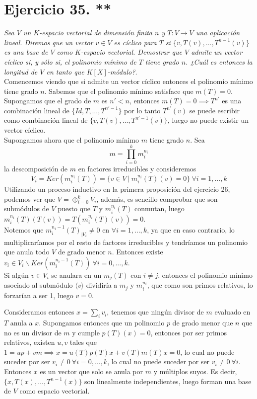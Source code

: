\section{Ejercicio 35. **} \textit{Sea \(V\) un \(K\)-espacio
  vectorial de dimensión finita \(n\) y \(T:V \to V\) una
  aplicación lineal. Diremos que un vector \(v \in V\) es cíclico para
  \(T\) si \(\{v, T(v), \dots, T^{n-1}(v)\}\) es una base de \(V\)
  como \(K\)-espacio vectorial. Demostrar que \(V\) admite un vector cíclico si,
  y sólo si, el polinomio mínimo de \(T\) tiene grado \(n\). ¿Cuál es entonces
  la longitud de \(V\) en tanto que \(K[X]\)-módulo?.}\\


Comencemos viendo que si admite un vector cíclico entonces el polinomio mínimo
tiene grado \(n\). Sabemos que el polinomio mínimo satisface que \(m(T)=0\). Supongamos que el
grado de \(m\) es \(n' < n\),  entonces \(m(T)=0 \implies T^{n'}\) es una
combinación lineal de \(\{Id,T,\dots,T^{n'-1}\}\) por lo tanto \(T^{n'}(v)\) se
puede escribir como combinación lineal de \(\{v,T(v),\dots,T^{n'-1}(v)\}\),
luego no puede existir un vector cíclico.\\

Supongamos ahora que el polinomio mínimo \(m\) tiene grado \(n\). Sea
\[
  m = \prod_{i=0}^k m_i^{n_i}
\]
la descomposición de \(m\) en factores irreducibles y consideremos
\[
  V_i = Ker(m_i^{n_i}(T)) = \{v \in V \ | \ m_i^{n_i}(T)(v) = 0\} \ \forall i = 1,\dots,k
\]
Utilizando un proceso inductivo en la primera proposición del ejercicio 26, podemos ver
que \(V = \oplus_{i=0}^k V_i\), además, es sencillo comprobar que son submódulos de \(V\) puesto que \(T\) y \(m_i^{n_i}(T)\)
conmutan, luego \(m_i^{n_i}(T)(T(v)) = T(m_i^{n_i}(T)(v)) = 0\).\\

Notemos que \(m_i^{n_i - 1}(T)_{|V_i} \neq 0\) en \(\forall i=1,\dots,k\), ya que en caso
contrario, lo multiplicaríamos por el resto de factores irreducibles y
tendríamos un polinomio que anula todo \(V\) de grado menor \(n\). Entonces existe \(v_i \in V_i\backslash Ker(m_i^{n_i-1}(T)) \ \forall i=0,\dots,k\).\\

Si algún \(v \in V_i\) se anulara en un \(m_j(T)\) con \(i \neq j\),
entonces el polinomio mínimo asociado al submódulo \(\langle v \rangle\) dividiría a \(m_j\) y
\(m_i^{n_i}\), que como son primos relativos, lo forzarían a ser 1, luego \(v = 0\).

Consideramos entonces \(x = \sum_i v_i\), tenemos que ningún divisor de \(m\)
evaluado en \(T\) anula a \(x\). Supongamos entonces que un polinomio \(p\) de
grado menor que \(n\) que no es un divisor de \(m\) y cumple \(p(T)(x) = 0\),
entonces por ser primos relativos, existen \(u,v\) tales que \(1 = up + vm
\implies x = u(T)p(T)x + v(T)m(T)x = 0 \), lo cual no puede suceder por ser
\(v_i \neq 0 \ \forall i=0,\dots,k\), lo cual no puede suceder por ser \(v_i \neq 0 \
\forall i\). \\

Entonces \(x\) es un vector que solo se anula
por \(m\) y múltiplos suyos. Es decir, \(\{x, T(x), \dots, T^{n-1}(x)\}\)
son linealmente independientes, luego forman una base de \(V\) como espacio
vectorial.\\
